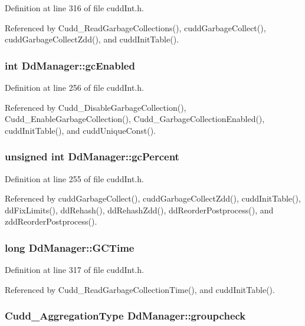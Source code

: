 Definition at line 316 of file cudd\-Int.h.

Referenced by Cudd\_\-Read\-Garbage\-Collections(), cudd\-Garbage\-Collect(), cudd\-Garbage\-Collect\-Zdd(), and cudd\-Init\-Table().
\subsubsection{\setlength{\rightskip}{0pt plus 5cm}int \bf{Dd\-Manager::gc\-Enabled}}\label{structDdManager_9ea7f1aaa19f3621745b590b7dca4f26}




Definition at line 256 of file cudd\-Int.h.

Referenced by Cudd\_\-Disable\-Garbage\-Collection(), Cudd\_\-Enable\-Garbage\-Collection(), Cudd\_\-Garbage\-Collection\-Enabled(), cudd\-Init\-Table(), and cudd\-Unique\-Const().
\subsubsection{\setlength{\rightskip}{0pt plus 5cm}unsigned int \bf{Dd\-Manager::gc\-Percent}}\label{structDdManager_970bc40d9aba2b14cdbaa43725ae7eb9}




Definition at line 255 of file cudd\-Int.h.

Referenced by cudd\-Garbage\-Collect(), cudd\-Garbage\-Collect\-Zdd(), cudd\-Init\-Table(), dd\-Fix\-Limits(), dd\-Rehash(), dd\-Rehash\-Zdd(), dd\-Reorder\-Postprocess(), and zdd\-Reorder\-Postprocess().
\subsubsection{\setlength{\rightskip}{0pt plus 5cm}long \bf{Dd\-Manager::GCTime}}\label{structDdManager_c73a33d4964fc283aeb955b90d371500}




Definition at line 317 of file cudd\-Int.h.

Referenced by Cudd\_\-Read\-Garbage\-Collection\-Time(), and cudd\-Init\-Table().
\subsubsection{\setlength{\rightskip}{0pt plus 5cm}\bf{Cudd\_\-Aggregation\-Type} \bf{Dd\-Manager::groupcheck}}\label{structDdManager_c7cc9100fc0deb8d4e5cdf92b96f075b}




